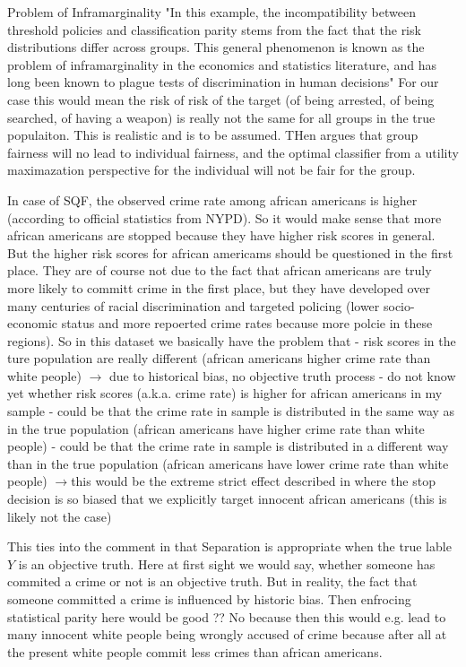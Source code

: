 Problem of Inframarginality \cite{corbett-davies}
"In this example, the incompatibility between threshold policies and classification parity stems from the fact that
the risk distributions differ across groups. This general phenomenon is known as the problem of inframarginality in
the economics and statistics literature, and has long been known to plague tests of discrimination in human decisions"
For our case this would mean the risk of risk of the target (of being arrested, of being searched, of having a weapon)
is really not the same for all groups in the true populaiton. This is realistic and is to be assumed. THen \cite{corbett-davies}
argues that group fairness will no lead to individual fairness, and the optimal classifier from a utility maximazation perspective
for the individual will not be fair for the group.

In case of SQF, the observed crime rate among african americans is higher (according to official statistics from NYPD).
So it would make sense that more african americans are stopped because they have higher risk scores in general. But the higher risk
scores for african americams should be questioned in the first place. They are of course not due to the fact that african americans
are truly more likely to committ crime in the first place, but they have developed over many centuries of racial discrimination
and targeted policing (lower socio-economic status and more repoerted crime rates because more polcie in these regions).
So in this dataset we basically have the problem that
- risk scores in the ture population are really different (african americans higher crime rate than white people) $\rightarrow$ due to historical bias, no objective truth process
- do not know yet whether risk scores (a.k.a. crime rate) is higher for african americans in my sample
- could be that the crime rate in sample is distributed in the same way as in the true population (african americans have higher crime rate than white people)
- could be that the crime rate in sample is distributed in a different way than in the true population (african americans have lower crime rate than white people)
$\rightarrow$this would be the extreme strict effect described in \cite{kallus2018} where the stop decision is so
biased that we explicitly target innocent african americans (this is likely not the case)

This ties into the comment in \cite{castelnovo2022} that Separation is appropriate when
the true lable $Y$ is an objective truth. Here at first sight we would say, whether someone
has commited a crime or not is an objective truth. But in reality, the fact that someone committed
a crime is influenced by historic bias.
Then enfrocing statistical parity here would be good ?? No because then this would e.g. lead
to many innocent white people being wrongly accused of crime because after all at the present white people
commit less crimes than african americans.


